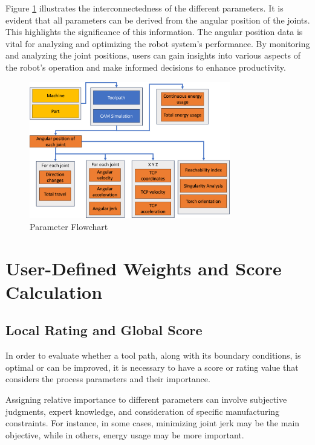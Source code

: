 Figure \ref{ParamsFlow} illustrates the interconnectedness of the different parameters. It is evident that all parameters can be derived from the angular position of the joints. This highlights the significance of this information. The angular position data is vital for analyzing and optimizing the robot system's performance. By monitoring and analyzing the joint positions, users can gain insights into various aspects of the robot's operation and make informed decisions to enhance productivity.




\begin{figure}[H]
	\centerline{\includegraphics[width=0.781\textwidth]{figures/Flow.png}}
	\caption{Parameter Flowchart}
	\label{ParamsFlow}
\end{figure}

\newpage

\section{User-Defined Weights and Score Calculation}\label{weights}
\subsection{Local Rating and Global Score}
In order to evaluate whether a tool path, along with its boundary conditions, is optimal or can be improved, it is necessary to have a score or rating value that considers the process parameters and their importance.

Assigning relative importance to different parameters can involve subjective judgments, expert knowledge, and consideration of specific manufacturing constraints. For instance, in some cases, minimizing joint jerk may be the main objective, while in others, energy usage may be more important.

